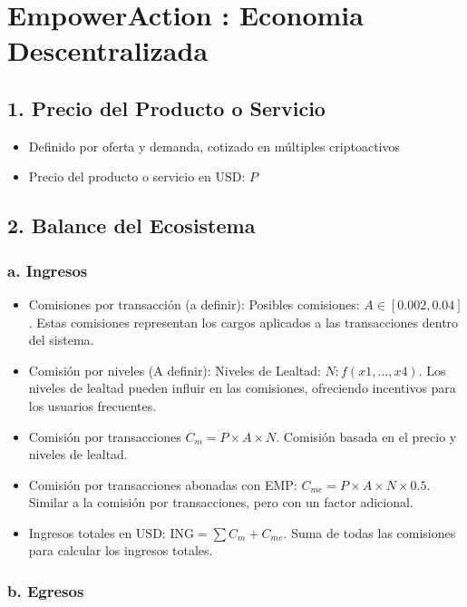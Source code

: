 \documentclass{article}
\begin{document}
\section*{EmpowerAction : Economia Descentralizada}

\subsection*{1. Precio del Producto o Servicio}
\begin{itemize}
    \item Definido por oferta y demanda, cotizado en múltiples criptoactivos
    \item Precio del producto o servicio en USD: \( P \)
\end{itemize}
\subsection*{2. Balance del Ecosistema}
\subsubsection*{a. Ingresos}
\begin{itemize}
    \item Comisiones por transacción (a definir): Posibles comisiones: \( A \in [0.002, 0.04] \). Estas comisiones representan los cargos aplicados a las transacciones dentro del sistema.
    \item Comisión por niveles (A definir): Niveles de Lealtad: \( N: f(x1,\ldots,x4) \). Los niveles de lealtad pueden influir en las comisiones, ofreciendo incentivos para los usuarios frecuentes.
    \item Comisión por transacciones \( C_m = P \times A \times N \). Comisión  basada en el precio y niveles de lealtad.
    \item Comisión por transacciones abonadas con EMP: \( C_{me} = P \times A \times N \times 0.5 \). Similar a la comisión por transacciones, pero con un factor adicional.
    \item Ingresos totales en USD: \( \text{ING} = \sum C_m + C_{me} \). Suma de todas las comisiones para calcular los ingresos totales.
\end{itemize}
\subsubsection*{b. Egresos}
\end{document}
